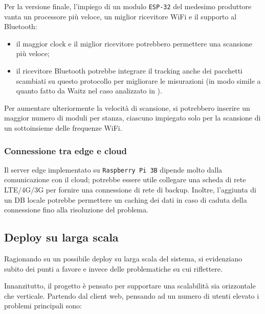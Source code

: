 Per la versione finale, l'impiego di un modulo \texttt{ESP-32} del medesimo produttore vanta un processore più veloce, un miglior ricevitore WiFi e il supporto al Bluetooth:
\begin{itemize}
  \item
    il maggior clock e il miglior ricevitore potrebbero permettere una scansione più veloce;
  \item
    il ricevitore Bluetooth potrebbe integrare il tracking anche dei pacchetti scambiati su questo protocollo per migliorare le misurazioni
    (in modo simile a quanto fatto da Waitz nel caso analizzato in ).
\end{itemize}

Per aumentare ulteriormente la velocità di scansione, si potrebbero inserire un maggior numero di moduli per stanza, ciascuno impiegato solo per la scansione di un sottoinsieme delle frequenze WiFi.

\subsubsection{Connessione tra edge e cloud}

Il server edge implementato su \texttt{Raspberry Pi 3B} dipende molto dalla comunicazione con il cloud;
potrebbe essere utile collegare una scheda di rete LTE/4G/3G per fornire una connessione di rete di backup.
Inoltre, l'aggiunta di un DB locale potrebbe permettere un caching dei dati in caso di caduta della connessione fino alla risoluzione del problema.

\subsection{Deploy su larga scala}

Ragionando su un possibile deploy su larga scala del sistema, si evidenziano subito dei punti a favore e invece delle problematiche su cui riflettere.

Innanzitutto, il progetto è pensato per supportare una scalabilità sia orizzontale che verticale.
Partendo dal client web, pensando ad un numero di utenti elevato i problemi principali sono:

